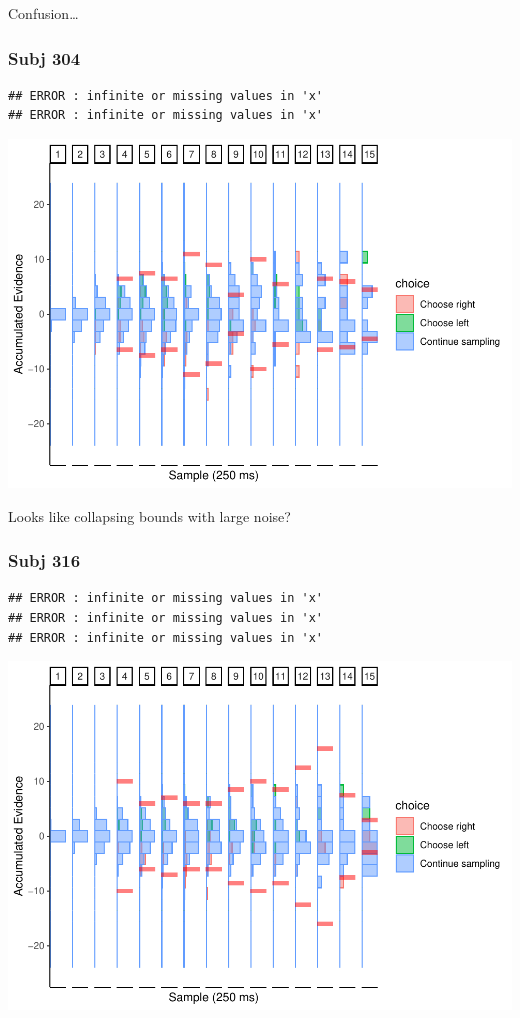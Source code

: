 \documentclass[
]{book}
\begin{document}
Confusion\ldots{}

\hypertarget{subj-304-1}{%
\subsubsection*{Subj 304}\label{subj-304-1}}

\begin{verbatim}
## ERROR : infinite or missing values in 'x' 
## ERROR : infinite or missing values in 'x'
\end{verbatim}

\includegraphics{LateNightBayes_files/figure-latex/unnamed-chunk-36-1.pdf}

Looks like collapsing bounds with large noise?

\hypertarget{subj-316-1}{%
\subsubsection*{Subj 316}\label{subj-316-1}}

\begin{verbatim}
## ERROR : infinite or missing values in 'x' 
## ERROR : infinite or missing values in 'x' 
## ERROR : infinite or missing values in 'x'
\end{verbatim}

\includegraphics{LateNightBayes_files/figure-latex/unnamed-chunk-37-1.pdf}
\end{document}
